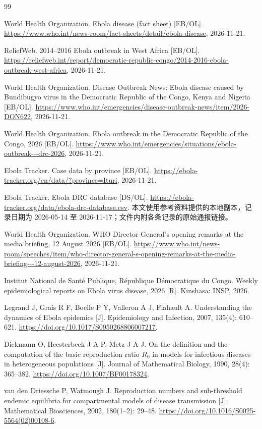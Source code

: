 \begin{thebibliography}{99}
\small

World Health Organization. Ebola disease (fact sheet) [EB/OL].
\url{https://www.who.int/news-room/fact-sheets/detail/ebola-disease},
2026-11-21.

ReliefWeb. 2014--2016 Ebola outbreak in West Africa [EB/OL].
\url{https://reliefweb.int/report/democratic-republic-congo/2014-2016-ebola-outbreak-west-africa},
2026-11-21.

World Health Organization. Disease Outbreak News: Ebola disease caused by Bundibugyo virus in the Democratic Republic of the Congo, Kenya and Nigeria [EB/OL].
\url{https://www.who.int/emergencies/disease-outbreak-news/item/2026-DON622},
2026-11-21.

World Health Organization. Ebola outbreak in the Democratic Republic of the Congo, 2026 [EB/OL].
\url{https://www.who.int/emergencies/situations/ebola-outbreak---drc-2026},
2026-11-21.

Ebola Tracker. Case data by province [EB/OL].
\url{https://ebola-tracker.org/en/data/?province=Ituri},
2026-11-21.

Ebola Tracker. Ebola DRC database [DS/OL].
\url{https://ebola-tracker.org/data/ebola-drc-database.csv}.
本文使用参考资料提供的本地副本，记录日期为 2026-05-14 至 2026-11-17；文件内附各条记录的原始通报链接。

World Health Organization. WHO Director-General's opening remarks at the media briefing, 12 August 2026 [EB/OL].
\url{https://www.who.int/news-room/speeches/item/who-director-general-s-opening-remarks-at-the-media-briefing---12-august-2026},
2026-11-21.

Institut National de Sant\'e Publique, R\'epublique D\'emocratique du Congo. Weekly epidemiological reports on Ebola virus disease, 2026 [R]. Kinshasa: INSP, 2026.

Legrand J, Grais R F, Boelle P Y, Valleron A J, Flahault A. Understanding the dynamics of Ebola epidemics [J]. Epidemiology and Infection, 2007, 135(4): 610--621.
\url{https://doi.org/10.1017/S0950268806007217}.

Diekmann O, Heesterbeek J A P, Metz J A J. On the definition and the computation of the basic reproduction ratio $R_0$ in models for infectious diseases in heterogeneous populations [J]. Journal of Mathematical Biology, 1990, 28(4): 365--382.
\url{https://doi.org/10.1007/BF00178324}.

van den Driessche P, Watmough J. Reproduction numbers and sub-threshold endemic equilibria for compartmental models of disease transmission [J]. Mathematical Biosciences, 2002, 180(1--2): 29--48.
\url{https://doi.org/10.1016/S0025-5564(02)00108-6}.

\end{thebibliography}
